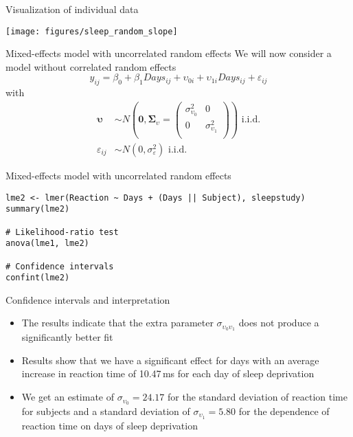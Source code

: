 \documentclass[aspectratio=169]{beamer}
\newcommand{\gvect}[1]{\boldsymbol{#1}}
\newcommand{\gmat}[1]{\boldsymbol{#1}}
\begin{document}
\begin{frame}{Visualization of individual data}
  \begin{center}
      \texttt{[image: figures/sleep\_random\_slope]}
  \end{center}
\end{frame}


\begin{frame}[fragile]{Mixed-effects model with uncorrelated random effects}
  We will now consider a model without correlated random effects
  \[
    y_{ij} = \beta_0 + \beta_1 Days_{ij} + \upsilon_{0i} + \upsilon_{1i} Days_{ij} +
    \varepsilon_{ij}
  \]
with
\begin{align*}
  \gvect{\upsilon} & \sim N\left(\gvect{0}, \gmat{\Sigma}_{\upsilon} = 
    \begin{pmatrix}
      \sigma^2_{\upsilon_0} & 0 \\
      0 & \sigma^2_{\upsilon_1} \\
    \end{pmatrix}\right) 
    \text{ i.i.d.} \\
  \varepsilon_{ij} & \sim N(0, \sigma_{\varepsilon}^2)
    \text{ i.i.d.}
\end{align*}
\end{frame}

{

\begin{frame}[fragile]{Mixed-effects model with uncorrelated random effects}
  \begin{lstlisting}
lme2 <- lmer(Reaction ~ Days + (Days || Subject), sleepstudy)
summary(lme2)

# Likelihood-ratio test
anova(lme1, lme2)

# Confidence intervals
confint(lme2)
  \end{lstlisting}
\end{frame}

}

\begin{frame}{Confidence intervals and interpretation}
  \begin{itemize}
    \item The results indicate that the extra parameter
      $\sigma_{\upsilon_0\upsilon_1}$ does not produce a significantly
      better fit
    \item Results show that we have a significant effect for days with an
  average increase in reaction time of 10.47\,ms for each day of sleep
  deprivation
    \item We get an estimate of $\sigma_{\upsilon_0} = 24.17$ for the
      standard deviation of reaction time for subjects and a standard
      deviation of $\sigma_{\upsilon_1} = 5.80$ for the dependence of
      reaction time on days of sleep deprivation
  \end{itemize}
\end{frame}
\end{document}
